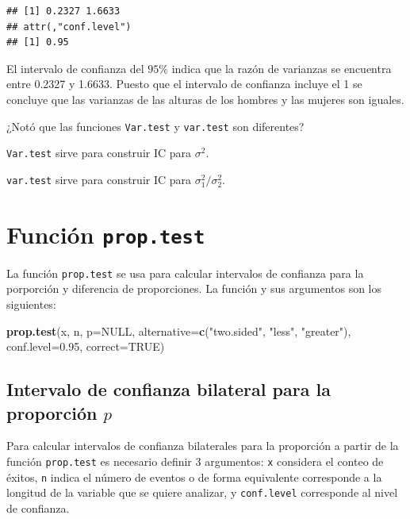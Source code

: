 \documentclass[10pt,]{krantz}
\makeatletter
\newenvironment{Shaded}{\begin{snugshade}}{\end{snugshade}}
\newcommand{\KeywordTok}[1]{\textcolor[rgb]{0.13,0.29,0.53}{\textbf{#1}}}
\newcommand{\DataTypeTok}[1]{\textcolor[rgb]{0.13,0.29,0.53}{#1}}
\newcommand{\FloatTok}[1]{\textcolor[rgb]{0.00,0.00,0.81}{#1}}
\newcommand{\StringTok}[1]{\textcolor[rgb]{0.31,0.60,0.02}{#1}}
\newcommand{\OtherTok}[1]{\textcolor[rgb]{0.56,0.35,0.01}{#1}}
\newcommand{\NormalTok}[1]{#1}
\newenvironment{kframe}{%
\medskip{}
\setlength{\fboxsep}{.8em}
 \def\at@end@of@kframe{}%
 \ifinner\ifhmode%
  \def\at@end@of@kframe{\end{minipage}}%
  \begin{minipage}{\columnwidth}%
 \fi\fi%
 \def\FrameCommand##1{\hskip\@totalleftmargin \hskip-\fboxsep
 \colorbox{shadecolor}{##1}\hskip-\fboxsep
     \hskip-\linewidth \hskip-\@totalleftmargin \hskip\columnwidth}%
 \MakeFramed {\advance\hsize-\width
   \@totalleftmargin\z@ \linewidth\hsize
   \@setminipage}}%
 {\par\unskip\endMakeFramed%
 \at@end@of@kframe}
\renewenvironment{Shaded}{\begin{kframe}}{\end{kframe}}
\let\BeginKnitrBlock\begin \let\EndKnitrBlock\end
\makeatother
\begin{document}
\begin{verbatim}
## [1] 0.2327 1.6633
## attr(,"conf.level")
## [1] 0.95
\end{verbatim}

El intervalo de confianza del \(95\%\) indica que la razón de varianzas
se encuentra entre 0.2327 y 1.6633. Puesto que el intervalo de confianza
incluye el 1 se concluye que las varianzas de las alturas de los hombres
y las mujeres son iguales.

\BeginKnitrBlock{rmdwarning}
¿Notó que las funciones \texttt{Var.test} y \texttt{var.test} son
diferentes?

\texttt{Var.test} sirve para construir IC para \(\sigma^2\).

\texttt{var.test} sirve para construir IC para
\(\sigma_1^2 / \sigma_2^2\).
\EndKnitrBlock{rmdwarning}

\section{\texorpdfstring{Función
\texttt{prop.test}}{Función prop.test}}\label{funcion-prop.test}

La función \texttt{prop.test} se usa para calcular intervalos de
confianza para la porporción y diferencia de proporciones. La función y
sus argumentos son los siguientes:

\begin{Shaded}
\begin{Highlighting}[]
\KeywordTok{prop.test}\NormalTok{(x, n, }\DataTypeTok{p=}\OtherTok{NULL}\NormalTok{,}
          \DataTypeTok{alternative=}\KeywordTok{c}\NormalTok{(}\StringTok{"two.sided"}\NormalTok{, }\StringTok{"less"}\NormalTok{, }\StringTok{"greater"}\NormalTok{),}
          \DataTypeTok{conf.level=}\FloatTok{0.95}\NormalTok{, }\DataTypeTok{correct=}\OtherTok{TRUE}\NormalTok{)}
\end{Highlighting}
\end{Shaded}

\subsection{\texorpdfstring{Intervalo de confianza bilateral para la
proporción
\(p\)}{Intervalo de confianza bilateral para la proporción p}}\label{intervalo-de-confianza-bilateral-para-la-proporcion-p}

Para calcular intervalos de confianza bilaterales para la proporción a
partir de la función \texttt{prop.test} es necesario definir 3
argumentos: \texttt{x} considera el conteo de éxitos, \texttt{n} indica
el número de eventos o de forma equivalente corresponde a la longitud de
la variable que se quiere analizar, y \texttt{conf.level} corresponde al
nivel de confianza.
\end{document}
